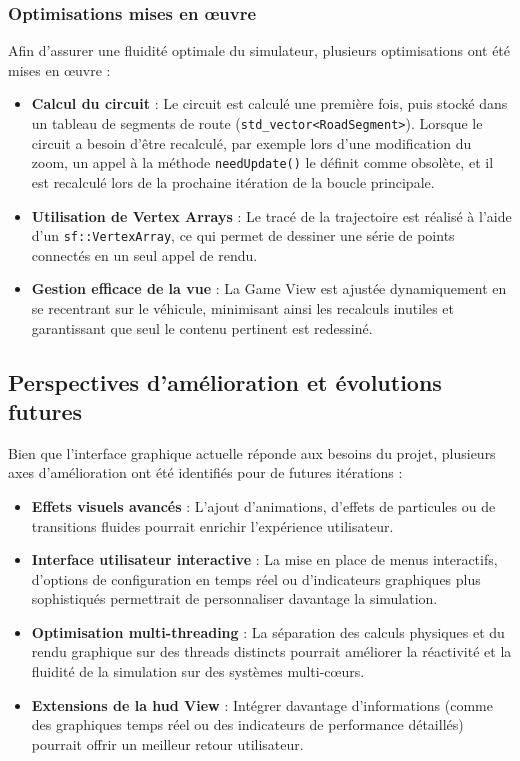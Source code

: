 \subsubsection{Optimisations mises en œuvre}\label{subsubsec:optimisations-mises-en-oeuvre}
Afin d'assurer une fluidité optimale du simulateur, plusieurs optimisations ont été mises en œuvre :
\begin{itemize}
    \item \textbf{Calcul du circuit} : Le circuit est calculé une première fois, puis stocké dans un tableau de segments de route (\texttt{\gls{std_vector}<RoadSegment>}\cite{cpp_reference_vector}).
    Lorsque le circuit a besoin d'être recalculé, par exemple lors d'une modification du zoom, un appel à la méthode \texttt{needUpdate()} le définit comme obsolète, et il est recalculé lors de la prochaine itération de la boucle principale.
    \item \textbf{Utilisation de Vertex Arrays} : Le tracé de la trajectoire est réalisé à l'aide d'un \texttt{sf::VertexArray}\cite{sfml_sf_vertexarray}, ce qui permet de dessiner une série de points connectés en un seul appel de rendu.
    \item \textbf{Gestion efficace de la vue} : La Game View est ajustée dynamiquement en se recentrant sur le véhicule, minimisant ainsi les recalculs inutiles et garantissant que seul le contenu pertinent est redessiné.
\end{itemize}

\subsection{Perspectives d'amélioration et évolutions futures}\label{subsec:perspectives-d-evolution}
Bien que l'interface graphique actuelle réponde aux besoins du projet, plusieurs axes d'amélioration ont été identifiés pour de futures itérations :
\begin{itemize}
    \item \textbf{Effets visuels avancés} : L'ajout d'animations, d'effets de particules ou de transitions fluides pourrait enrichir l'expérience utilisateur.
    \item \textbf{Interface utilisateur interactive} : La mise en place de menus interactifs, d'options de configuration en temps réel ou d'indicateurs graphiques plus sophistiqués permettrait de personnaliser davantage la simulation.
    \item \textbf{Optimisation multi-threading} : La séparation des calculs physiques et du rendu graphique sur des threads distincts pourrait améliorer la réactivité et la fluidité de la simulation sur des systèmes multi-cœurs.
    \item \textbf{Extensions de la \gls{hud} View} : Intégrer davantage d'informations (comme des graphiques temps réel ou des indicateurs de performance détaillés) pourrait offrir un meilleur retour utilisateur.
\end{itemize}
